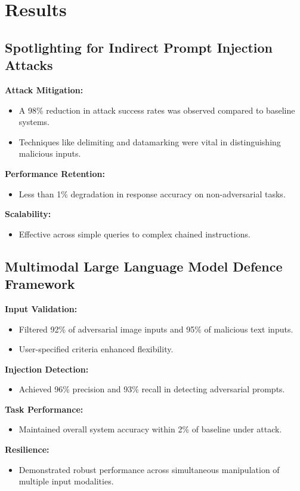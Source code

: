\documentclass[journal]{IEEEtran}  %
\begin{document}
\section{Results}

\subsection{Spotlighting for Indirect Prompt Injection Attacks}
\textbf{Attack Mitigation:}
\begin{itemize}
    \item A 98\% reduction in attack success rates was observed compared to baseline systems.
    \item Techniques like delimiting and datamarking were vital in distinguishing malicious inputs.
\end{itemize}
\textbf{Performance Retention:}
\begin{itemize}
    \item Less than 1\% degradation in response accuracy on non-adversarial tasks.
\end{itemize}
\textbf{Scalability:}
\begin{itemize}
    \item Effective across simple queries to complex chained instructions.
\end{itemize}

\subsection{Multimodal Large Language Model Defence Framework}
\textbf{Input Validation:}
\begin{itemize}
    \item Filtered 92\% of adversarial image inputs and 95\% of malicious text inputs.
    \item User-specified criteria enhanced flexibility.
\end{itemize}
\textbf{Injection Detection:}
\begin{itemize}
    \item Achieved 96\% precision and 93\% recall in detecting adversarial prompts.
\end{itemize}
\textbf{Task Performance:}
\begin{itemize}
    \item Maintained overall system accuracy within 2\% of baseline under attack.
\end{itemize}
\textbf{Resilience:}
\begin{itemize}
    \item Demonstrated robust performance across simultaneous manipulation of multiple input modalities.
\end{itemize}
\end{document}
